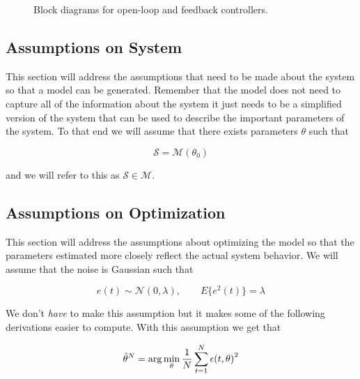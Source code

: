 \begin{figure}[ht!]
\centering
{} \hfill
{} \hfill
\caption{Block diagrams for open-loop and feedback controllers.}%
\label{fig:13blocks}
\end{figure}

\subsection{Assumptions on System}
This section will address the assumptions that need to be made about the system so that a model can be generated.
Remember that the model does not need to capture all of the information about the system it just needs to be a simplified version of the system that can be used to describe the important parameters of the system.
To that end we will assume that there exists parameters $\theta$ such that

\begin{equation*}
\mathcal{S}=\mathcal{M}(\theta_0)
\end{equation*}

and we will refer to this as $\mathcal{S}\in\mathcal{M}$.

\subsection{Assumptions on Optimization}
This section will address the assumptions about optimizing the model so that the parameters estimated more closely reflect the actual system behavior.
We will assume that the noise is Gaussian such that

\begin{equation*}
e(t)\sim\mathcal{N}(0,\lambda), \qquad E\{e^2(t)\}=\lambda
\end{equation*}

We don't \textit{have} to make this assumption but it makes some of the following derivations easier to compute.
With this assumption we get that

\begin{equation*}
\hat{\theta}^N = \arg\min_\theta \frac{1}{N}\sum_{t=1}^N \epsilon{(t,\theta)}^2
\end{equation*}


